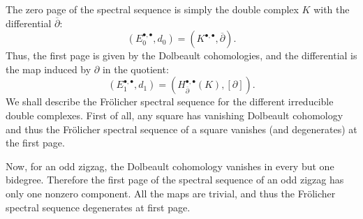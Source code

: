\documentclass[leqno]{article}
\theoremstyle{definition}
\numberwithin{equation}{section}
\begin{document}
The zero page of the spectral sequence is simply the double complex $K$ with the differential $\overline{\partial}$:
\[
(E_0^{\bullet, \bullet}, d_0)
=
(K^{\bullet, \bullet}, \overline{\partial}).
\]
Thus, the first page is given by the Dolbeault cohomologies, and the differential is the map induced by $\partial$ in the quotient:
\[
(E_1^{\bullet, \bullet}, d_1)
=
(H^{\bullet, \bullet}_{\overline{\partial}}(K), [\partial]).
\]
We shall describe the Frölicher spectral sequence for the different irreducible double complexes. First of all, any square has vanishing Dolbeault cohomology and thus the Frölicher spectral sequence of a square vanishes (and degenerates) at the first page.

Now, for an odd zigzag, the Dolbeault cohomology vanishes in every but one bidegree. Therefore the first page of the spectral sequence of an odd zigzag has only one nonzero component. All the maps are trivial, and thus the Frölicher spectral sequence degenerates at first page.
\end{document}
